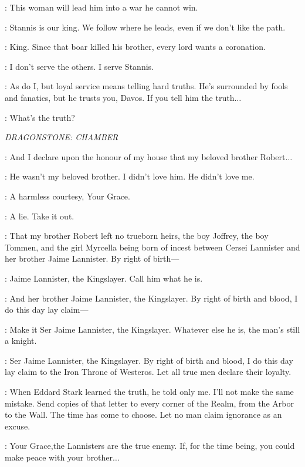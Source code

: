 \CRESSEN:  This woman will lead him into a war he cannot win.

\DAVOS: Stannis is our king. We follow where he leads, even if we don't like the path.

\CRESSEN: King. Since that boar killed his brother, every lord wants a coronation.

\DAVOS: I don't serve the others. I serve Stannis.

\enlargethispage*{40pt}
\CRESSEN: As do I, but loyal service means telling hard truths. He's surrounded by fools and fanatics, but he trusts you, Davos. If you tell him the truth$\ldots$

\DAVOS: What's the truth?


\scene

\textit{DRAGONSTONE: CHAMBER}


\MATTHOS: And I declare upon the honour of my house that my beloved brother Robert$\ldots$

\STANNIS: He wasn't my beloved brother. I didn't love him. He didn't love me.

\DAVOS: A harmless courtesy, Your Grace.

\STANNIS: A lie. Take it out.

\MATTHOS: That my brother Robert left no trueborn heirs, the boy Joffrey, the boy Tommen, and the girl Myrcella being born of incest between Cersei Lannister and her brother Jaime Lannister. By right of birth---

\STANNIS: Jaime Lannister, the Kingslayer. Call him what he is.

\MATTHOS: And her brother Jaime Lannister, the Kingslayer. By right of birth and blood, I do this day lay claim---

\STANNIS: Make it Ser Jaime Lannister, the Kingslayer. Whatever else he is, the man's still a knight.

\MATTHOS: Ser Jaime Lannister, the Kingslayer. By right of birth and blood, I do this day lay claim to the Iron Throne of Westeros. Let all true men declare their loyalty.

\STANNIS: When Eddard Stark learned the truth, he told only me. I'll not make the same mistake. Send copies of that letter to every corner of the Realm, from the Arbor to the Wall. The time has come to choose. Let no man claim ignorance as an excuse.

\DAVOS: Your Grace,the Lannisters are the true enemy. If, for the time being, you could make peace with your brother$\ldots$

